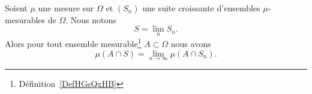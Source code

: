 
\begin{proposition} \label{PropAFNPSsm}
	Soient \( \mu\) une mesure sur \( \Omega\) et \( (S_n)\) une suite croissante d'ensembles \( \mu\)-mesurables de \( \Omega\). Nous notons
	\begin{equation}
		S=\lim_nS_n.
	\end{equation}
	Alors pour tout ensemble mesurable\footnote{Définition~\ref{DefHGsQxHB}} \( A\subset\Omega\) nous avons
	\begin{equation}
		\mu(A\cap S)=\lim_{n\to \infty} \mu(A\cap S_n).
	\end{equation}
\end{proposition}

